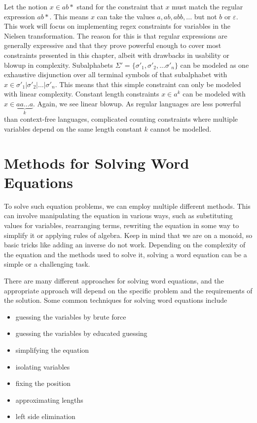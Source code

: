 Let the notion $x \in ab*$ stand for the constraint that $x$ must match the regular expression $ab*$. This means $x$ can take the values $a, ab, abb, ...$ but not $b$ or $\varepsilon$. This work will focus on implementing regex constraints for variables in the Nielsen transformation. The reason for this is that regular expressions are generally expressive and that they prove powerful enough to cover most constraints presented in this chapter, albeit with drawbacks in usability or blowup in complexity. Subalphabets $\Sigma' = \{\sigma'_1, \sigma'_2, ... \sigma'_n\}$ can be modeled as one exhaustive disjunction over all terminal symbols of that subalphabet with $x \in \sigma'_1 | \sigma'_2 | ... | \sigma'_n$. This means that this simple constraint can only be modeled with linear complexity. Constant length constraints $x \in a^k$ can be modeled with $x \in \underbrace{aa...a}_{k}$. Again, we see linear blowup.
As regular languages are less powerful than context-free languages, complicated counting constraints where multiple variables depend on the same length constant $k$ cannot be modelled.

\section{Methods for Solving Word Equations} \label{methods}

To solve such equation problems, we can employ multiple different methods. This can involve manipulating the equation in various ways, such as substituting values for variables, rearranging terms, rewriting the equation in some way to simplify it or applying rules of algebra. Keep in mind that we are on a monoid, so basic tricks like adding an inverse do not work. Depending on the complexity of the equation and the methods used to solve it, solving a word equation can be a simple or a challenging task.

There are many different approaches for solving word equations, and the appropriate approach will depend on the specific problem and the requirements of the solution. Some common techniques for solving word equations include
\begin{itemize}
    \item guessing the variables by brute force
    \item guessing the variables by educated guessing
    \item simplifying the equation
    \item isolating variables
    \item fixing the position
    \item approximating lengths
    \item left side elimination
\end{itemize}

